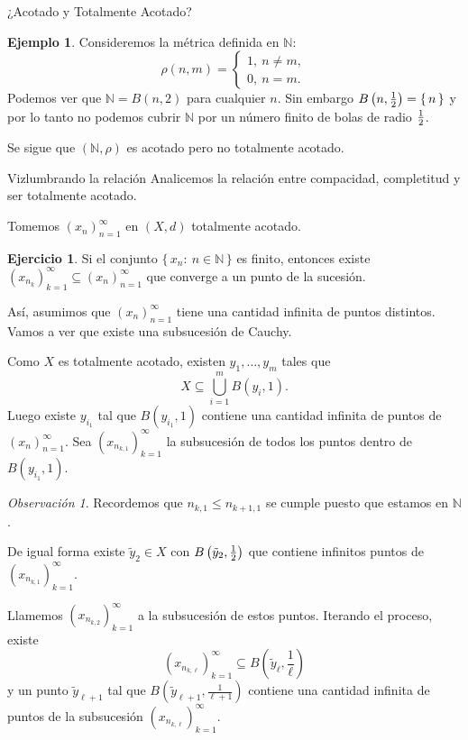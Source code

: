 \documentclass[utf8]{beamer}
\theoremstyle{plain}
\theoremstyle{definition}
\newtheorem{Ex}{Ejemplo}               %
\newtheorem{Ej}{Ejercicio}             %
\theoremstyle{remark}
\newtheorem{Rmk}[Th]{Observación}      %
\numberwithin{equation}{section}
\newcommand{\bN}{\mathbb{N}}    %
\newcommand{\set}[1]{\{\,#1\,\}}    %
\renewcommand{\l}{\ell}                   %
\renewcommand{\leq}{\leqslant}          %
\newcommand{\half}{{\mathchoice{\nhalf}{\thalf}{\shalf}{\shalf}}} %
\newcommand{\nhalf}{\frac{1}{2}}
\newcommand{\shalf}{{\scriptstyle\frac{1}{2}}} %
\newcommand{\thalf}{{\tfrac{1}{2}}} %
\newcommand{\sucn}{_{n=1}^\infty} %
\newcommand{\suck}{_{k=1}^\infty} %
\begin{document}
\begin{frame}{¿Acotado y Totalmente Acotado?}
  \begin{Ex}
    Consideremos la métrica definida en $\bN$: 
    $$\rho(n,m)=\left\lbrace\begin{aligned}
      1,\ n\neq m,\\
      0,\ n=m.
    \end{aligned}\right.$$
    Podemos ver que $\bN= B(n,2)$ para cualquier $n$. Sin embargo $B\left(n,\half\right)=\set{n}$ y por lo tanto no podemos cubrir $\bN$ por un número finito de bolas de radio $\half$.\par 
    Se sigue que $(\bN,\rho)$ es acotado pero no totalmente acotado.
  \end{Ex}
  \end{frame}

\begin{frame}{Vizlumbrando la relación}
  Analicemos la relación entre compacidad, completitud y ser totalmente acotado.\par 
  Tomemos $(x_n)\sucn$ en $(X,d)$ totalmente acotado.
  \begin{Ej}
    Si el conjunto $\set{x_n:\ n\in \bN}$ es finito, entonces existe $(x_{n_k})\suck\subseteq(x_n)\sucn$ que converge a un punto de la sucesión.
  \end{Ej}
  Así, asumimos que $(x_n)\sucn$ tiene una cantidad infinita de puntos distintos. Vamos a ver que existe una subsucesión de Cauchy.
\end{frame}

\begin{frame}
  Como $X$ es totalmente acotado, existen $y_1,\dots,y_m$ tales que 
  $$X\subseteq \bigcup_{i=1}^m B(y_i,1).$$
  Luego existe $y_{i_1}$ tal que $B(y_{i_1},1)$ contiene una cantidad infinita de puntos de $(x_n)\sucn$. Sea $(x_{n_{k,1}})\suck$ la subsucesión de todos los puntos dentro de $B(y_{i_1},1)$.
  \begin{Rmk}
    Recordemos que $n_{k,1}\leq n_{k+1,1}$ se cumple puesto que estamos en $\bN$.
  \end{Rmk}
\end{frame}

\begin{frame}
  De igual forma existe $\tilde{y}_2\in X$ con $B\left(\tilde{y}_2,\half\right)$ que contiene infinitos puntos de $(x_{n_{k,1}})\suck$.\par 
  Llamemos $(x_{n_{k,2}})\suck$ a la subsucesión de estos puntos. Iterando el proceso, existe
  $$(x_{n_{k,\l}})\suck\subseteq B\left(\tilde{y}_\l,\frac1\l\right)$$
   y un punto $\tilde{y}_{\l+1}$ tal que $B\left(\tilde{y}_{\l+1},\frac{1}{\l+1}\right)$ contiene una cantidad infinita de puntos de la subsucesión $(x_{n_{k,\l}})\suck$.
\end{frame}
\end{document}
